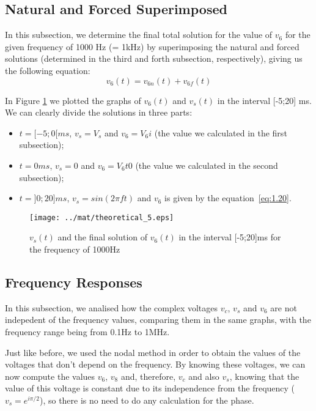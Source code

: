 \subsection{Natural and Forced Superimposed}
In this subsection, we determine the final total solution for the value of $v_6$ for the given frequency of 1000 Hz (= 1kHz) by superimposing the natural and forced solutions (determined in the third and forth subsection, respectively), giving us the following equation:
\begin{equation}
v_6(t) = v_{6n}(t) + v_{6f}(t)
\label{eq:1.20}
\end{equation}

\pagebreak In Figure \ref{fig:mat4} we plotted the graphs of $v_6(t)$ and $v_s(t)$ in the interval [-5;20] ms. We can clearly divide the solutions in three parts:
\begin{itemize}
\item $t=[-5;0[ ms$, $v_s = V_s$ and $v_6 = V_6i$ (the value we calculated in the first subsection);
\item $t=0 ms$, $v_s = 0$ and $v_6 = V_6t0$ (the value we calculated in the second subsection);
\item $t=]0;20] ms$, $v_s = sin(2\pi f t)$ and $v_6$ is given by the equation~\ref{eq:1.20}.
\end{itemize}

\begin{figure}[H] \centering
\texttt{[image: ../mat/theoretical\_5.eps]}
\caption{$v_s(t)$ and the final solution of $v_6(t)$ in the interval [-5;20]ms for the frequency of 1000Hz}
\label{fig:mat4}
\end{figure}


\subsection{Frequency Responses}
In this subsection, we analised how the complex voltages $v_c$, $v_s$ and $v_6$ are not indepedent of the frequency values, comparing them in the same graphs, with the frequency range being from 0.1Hz to 1MHz. 

Just like before, we used the nodal method in order to obtain the values of the voltages that don't depend on the frequency. By knowing these voltages, we can now compute the values $v_6$, $v_8$ and, therefore, $v_c$ and also $v_s$, knowing that the value of this voltage is constant due to its independence from the frequency ($v_s = e^{i\pi/2}$), so there is no need to do any calculation for the phase.

